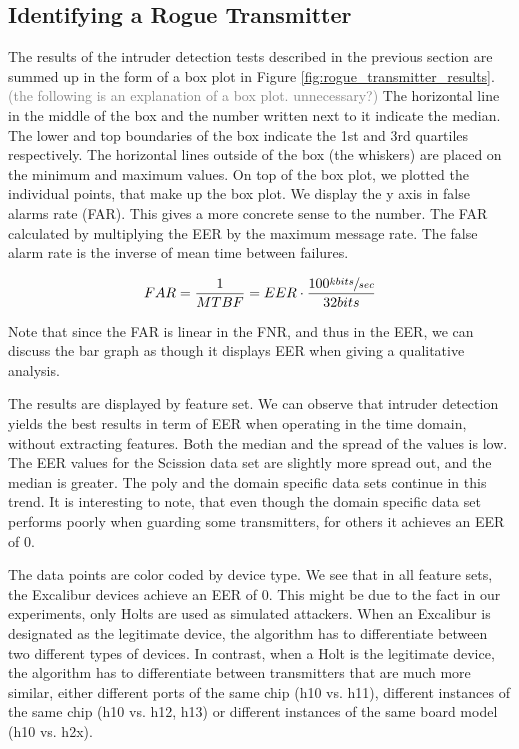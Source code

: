 \documentclass[conference]{IEEEtran}
\begin{document}
\subsection{Identifying a Rogue Transmitter}
  The results of the intruder detection tests described in the previous section are summed up in the form of a box plot in Figure \ref{fig:rogue_transmitter_results}. \textcolor{gray}{(the following is an explanation of a box plot. unnecessary?)} The horizontal line in the middle of the box and the number written next to it indicate the median. The lower and top boundaries of the box indicate the 1st and 3rd quartiles respectively. The horizontal lines outside of the box (the whiskers) are placed on the minimum and maximum values. On top of the box plot, we plotted the individual points, that make up the box plot.
  We display the y axis in false alarms rate (FAR). This gives a more concrete sense to the number. The FAR calculated by multiplying the EER by the maximum message rate. The false alarm rate is the inverse of mean time between failures.
  
  \[FAR = \frac{1}{MTBF} = EER \cdot \frac{100 \sfrac{kbits}{sec}}{32bits}\]
  
  Note that since the FAR is linear in the FNR, and thus in the EER, we can discuss the bar graph as though it displays EER when giving a qualitative analysis.
  
  The results are displayed by feature set. We can observe that intruder detection yields the best results in term of EER when operating in the time domain, without extracting features. Both the median and the spread of the values is low. The EER values for the Scission data set are slightly more spread out, and the median is greater. The poly and the domain specific data sets continue in this trend. It is interesting to note, that even though the domain specific data set performs poorly when guarding some transmitters, for others it achieves an EER of 0.
  
  The data points are color coded by device type. We see that in all feature sets, the Excalibur devices achieve an EER of 0. This might be due to the fact in our experiments, only Holts are used as simulated attackers. When an Excalibur is designated as the legitimate device, the algorithm has to differentiate between two different types of devices. In contrast, when a Holt is the legitimate device, the algorithm has to differentiate between transmitters that are much more similar, either different ports of the same chip (h10 vs. h11), different instances of the same chip (h10 vs. h12, h13) or different instances of the same board model (h10 vs. h2x).
  
\end{document}
